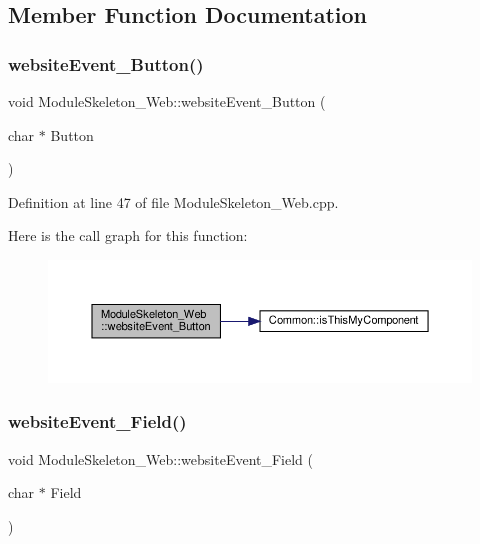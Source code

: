 \subsection{Member Function Documentation}
\mbox{\label{class_module_skeleton___web_a2946ad7edbf3aa43aa462a0c5350cb84}} 
\subsubsection{\texorpdfstring{website\+Event\+\_\+\+Button()}{websiteEvent\_Button()}}
{\footnotesize\ttfamily void Module\+Skeleton\+\_\+\+Web\+::website\+Event\+\_\+\+Button (\begin{DoxyParamCaption}\item[{char $\ast$}]{Button }\end{DoxyParamCaption})}



Definition at line 47 of file Module\+Skeleton\+\_\+\+Web.\+cpp.

Here is the call graph for this function\+:
\nopagebreak
\begin{figure}[H]
\begin{center}
\leavevmode
\includegraphics[width=350pt]{class_module_skeleton___web_a2946ad7edbf3aa43aa462a0c5350cb84_cgraph}
\end{center}
\end{figure}
\mbox{\label{class_module_skeleton___web_aeff57d699bdcbab91538f8073cdbf9b0}} 
\subsubsection{\texorpdfstring{website\+Event\+\_\+\+Field()}{websiteEvent\_Field()}}
{\footnotesize\ttfamily void Module\+Skeleton\+\_\+\+Web\+::website\+Event\+\_\+\+Field (\begin{DoxyParamCaption}\item[{char $\ast$}]{Field }\end{DoxyParamCaption})}



